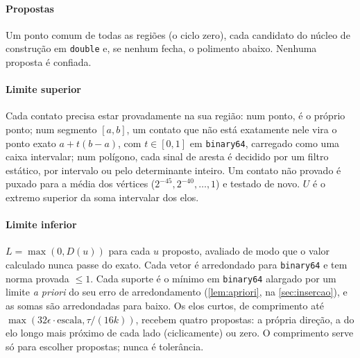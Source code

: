 \documentclass[11pt,a4paper]{article}
\theoremstyle{plain}\newtheorem{proposicao}{Proposição}
\theoremstyle{definition}\newtheorem{definicao}{Definição}
\theoremstyle{plain}\newtheorem{teorema}{Teorema}
\theoremstyle{plain}\newtheorem{lema}{Lema}
\begin{document}
\paragraph{Propostas} Um ponto comum de todas as regiões (o ciclo zero), cada candidato do núcleo de construção em \texttt{double} e, se nenhum fecha, o polimento abaixo. Nenhuma proposta é confiada.

\paragraph{Limite superior} Cada contato precisa estar provadamente na sua região: num ponto, é o próprio ponto; num segmento \([a,b]\), um contato que não está exatamente nele vira o ponto exato \(a+t(b-a)\), com \(t\in[0,1]\) em \texttt{binary64}, carregado como uma caixa intervalar; num polígono, cada sinal de aresta é decidido por um filtro estático, por intervalo ou pelo determinante inteiro. Um contato não provado é puxado para a média dos vértices (\(2^{-45},2^{-40},\dots,1\)) e testado de novo. \(U\) é o extremo superior da soma intervalar dos elos.

\paragraph{Limite inferior} \(L=\max(0,D(u))\) para cada \(u\) proposto, avaliado de modo que o valor calculado nunca passe do exato. Cada vetor é arredondado para \texttt{binary64} e tem norma provada \(\le1\). Cada suporte é o mínimo em \texttt{binary64} alargado por um limite \emph{a priori} do seu erro de arredondamento (\cref{lem:apriori}, na \cref{sec:insercao}), e as somas são arredondadas para baixo. Os elos curtos, de comprimento até \(\max(32\epsilon\cdot\text{escala},\tau/(16k))\), recebem quatro propostas: a própria direção, a do elo longo mais próximo de cada lado (ciclicamente) ou zero. O comprimento serve só para escolher propostas; nunca é tolerância.
\end{document}
